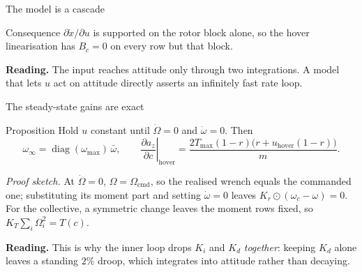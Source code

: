 \documentclass[10pt]{beamer}
\newcommand{\takeaway}[1]{\par\vfill{\footnotesize\textbf{Reading.} #1\par}}
\begin{document}
\begin{frame}{The model is a cascade}
  \centering
  \vspace{4pt}
  \begin{block}{Consequence}
    $\partial\dot x/\partial u$ is supported on the rotor block alone, so the
    hover linearisation has $B_c=0$ on every row but that block.
  \end{block}
  \takeaway{The input reaches attitude only through two integrations. A model
    that lets $u$ act on attitude directly asserts an infinitely fast rate
    loop.}
\end{frame}

\begin{frame}{The steady-state gains are exact}
  \begin{block}{Proposition}
    Hold $u$ constant until $\dot\Omega=0$ and $\dot\omega=0$. Then
    \[
      \omega_\infty=\operatorname{diag}(\omega_{\max})\,\bar\omega,
      \qquad
      \left.\frac{\partial a_z}{\partial c}\right|_{\mathrm{hover}}
      =\frac{2T_{\max}(1-r)\big(r+u_{\mathrm{hover}}(1-r)\big)}{m}.
    \]
  \end{block}
  \emph{Proof sketch.} At $\dot\Omega=0$, $\Omega=\Omega_{\mathrm{cmd}}$, so
  the realised wrench equals the commanded one; substituting its moment part
  and setting $\dot\omega=0$ leaves $K_r\odot(\omega_c-\omega)=0$. For the
  collective, a symmetric change leaves the moment rows fixed, so
  $K_T\sum_i\Omega_i^{2}=T(c)$.
  \takeaway{This is why the inner loop drops $K_i$ and $K_d$ \emph{together}:
    keeping $K_d$ alone leaves a standing $2\%$ droop, which integrates into
    attitude rather than decaying.}
\end{frame}
\end{document}
